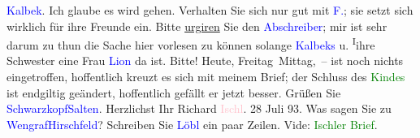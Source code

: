                   \textcolor{blue}{Kalbek}{}\ledrightnote{\textcolor{blue}{Julie Kalbeck}}.\pend
           \pstart
           Ich glaube es wird gehen. Verhalten Sie sich nur gut mit \textcolor{blue}{F.}{}\ledrightnote{\textcolor{blue}{Bertha Flegmann}}; sie setzt sich {\pb}wirklich für ihre Freunde ein.
               Bitte \uline{urgiren} Sie den \textcolor{blue}{Abschreiber}{}; mir ist sehr darum zu thun die Sache hier
               vorlesen zu können solange \textcolor{blue}{Kalbeks}{}\ledrightnote{\textcolor{blue}{Max Kalbeck}{\newline}\textcolor{blue}{Julie Kalbeck}} u. \substVorne{}\textsuperscript{I}\substDazwischen{}i\substHinten{}hre Schwester eine Frau \textcolor{blue}{Lion}{}\ledrightnote{\textcolor{blue}{Lion}} da ist.
               Bitte!\pend
           \pstart
           Heute, Freitag Mittag, – ist noch nichts eingetroffen,
               hoffentlich kreuzt {\pb}es sich mit
               meinem Brief; der Schluss des \textcolor{green}{Kindes}{}\ledrightnote{\textcolor{green}{Das Kind}} ist endgiltig
               geändert, hoffentlich gefällt er jetzt besser.\pend
           \pstart
           Grüßen Sie \textcolor{blue}{Schwarzkopf}{}\ledrightnote{\textcolor{blue}{Gustav Schwarzkopf}}{ }\textcolor{blue}{Salten}{}\ledrightnote{\textcolor{blue}{Felix Salten}}. Herzlichst Ihr\pend
           \pstart \spacefill\mbox{Richard}\pend{}\pstart
           \textcolor{pink}{Ischl}{}\ledrightnote{\textcolor{pink}{Bad Ischl}}. 28 Juli 93.\pend
           \pstart
           \noindent{}Was sagen Sie zu \textcolor{blue}{Wengraf}{}\ledrightnote{\textcolor{blue}{Edmund Wengraf}}{ }\textcolor{green}{\textcolor{blue}{Hirschfeld}{}\ledrightnote{\textcolor{blue}{Robert Hirschfeld}}}{}?\pend
           \pstart
           Schreiben Sie \textcolor{blue}{Löbl}{}\ledrightnote{\textcolor{blue}{Emil Löbl}} ein paar Zeilen. Vide: \textcolor{green}{Ischler Brief}{}.\pend
           \endnumbering{}  
      